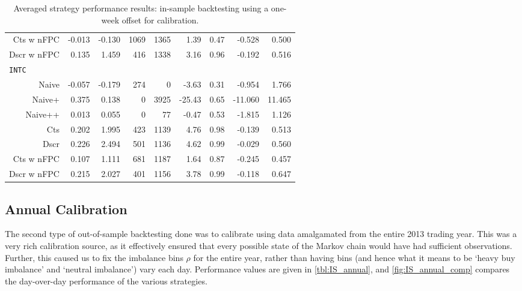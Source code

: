\begin{table}
\begin{tabular}{@{} *{9}{r} @{}}
Cts w nFPC & -0.013 & -0.130 & 1069 & 1365 & 1.39 & 0.47 & -0.528 & 0.500 \\ 
Dscr w nFPC & 0.135 & 1.459 & 416 & 1338 & 3.16 & 0.96 & -0.192 & 0.516 \\[2ex]
\multicolumn{9}{l}{\texttt{INTC}} \\ 
Naive & -0.057 & -0.179 & 274 & 0 & -3.63 & 0.31 & -0.954 & 1.766 \\ 
Naive+ & 0.375 & 0.138 & 0 & 3925 & -25.43 & 0.65 & -11.060 & 11.465 \\ 
Naive++ & 0.013 & 0.055 & 0 & 77 & -0.47 & 0.53 & -1.815 & 1.126 \\ 
Cts & 0.202 & 1.995 & 423 & 1139 & 4.76 & 0.98 & -0.139 & 0.513 \\ 
Dscr & 0.226 & 2.494 & 501 & 1136 & 4.62 & 0.99 & -0.029 & 0.560 \\ 
Cts w nFPC & 0.107 & 1.111 & 681 & 1187 & 1.64 & 0.87 & -0.245 & 0.457 \\ 
Dscr w nFPC & 0.215 & 2.027 & 401 & 1156 & 3.78 & 0.99 & -0.118 & 0.647 \\ 
\bottomrule
\end{tabular}
\caption{Averaged strategy performance results: in-sample backtesting using a one-week offset for calibration.}
\label{tbl:IS_week}
\end{table}

\FloatBarrier
\subsection{Annual Calibration}
The second type of out-of-sample backtesting done was to calibrate using data amalgamated from the entire 2013 trading year. This was a very rich calibration source, as it effectively ensured that every possible state of the Markov chain would have had sufficient observations. Further, this caused us to fix the imbalance bins $\rho$ for the entire year, rather than having bins (and hence what it means to be `heavy buy imbalance' and `neutral imbalance') vary each day. Performance values are given in \autoref{tbl:IS_annual}, and \autoref{fig:IS_annual_comp} compares the day-over-day performance of the various strategies. 

